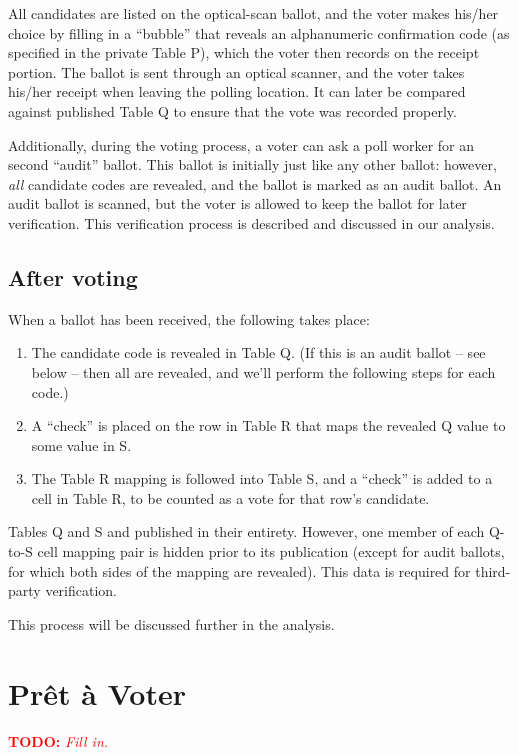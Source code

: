 \documentclass[10pt]{article}
\newcommand{\todo}[1]{\textcolor{red}{\textbf{TODO:} \emph{#1}}}
\newcommand{\preta}{Pr\^{e}t \`{a}}
\newcommand{\pv}{\preta{} Voter}
\begin{document}
\begin{multicols}{2}
All candidates are listed on the optical-scan ballot, and the voter makes his/her choice by filling
in a ``bubble'' that reveals an alphanumeric confirmation code (as specified in the private Table
P), which the voter then records on the receipt portion. The ballot is sent through an optical
scanner, and the voter takes his/her receipt when leaving the polling location. It can later be
compared against published Table Q to ensure that the vote was recorded properly.

Additionally, during the voting process, a voter can ask a poll worker for an second ``audit''
ballot. This ballot is initially just like any other ballot: however, \emph{all} candidate codes are
revealed, and the ballot is marked as an audit ballot. An audit ballot is scanned, but the voter is
allowed to keep the ballot for later verification. This verification process is described and
discussed in our analysis.

\subsection{After voting}

When a ballot has been received, the following takes place:
\begin{enumerate}
	\item
		The candidate code is revealed in Table Q. (If this is an audit ballot -- see below -- then all
		are revealed, and we'll perform the following steps for each code.)
	\item
		A ``check'' is placed on the row in Table R that maps the revealed Q value to some value in S.
	\item
		The Table R mapping is followed into Table S, and a ``check'' is added to a cell in Table R,
		to be counted as a vote for that row's candidate.
\end{enumerate}

Tables Q and S and published in their entirety. However, one member of each Q-to-S cell mapping pair
is hidden prior to its publication (except for audit ballots, for which both sides of the mapping
are revealed). This data is required for third-party verification.

This process will be discussed further in the analysis.


\section{\pv{}}

\todo{Fill in.}


\end{multicols}
\end{document}

